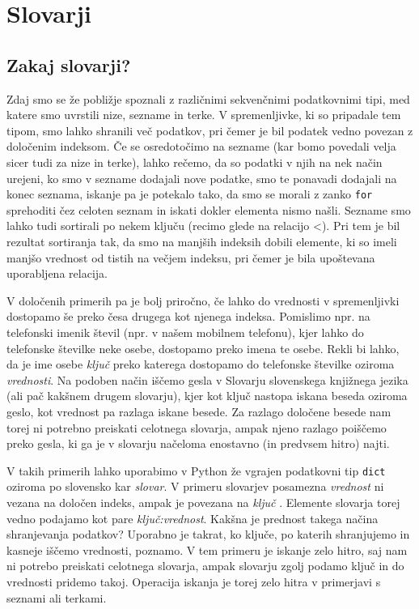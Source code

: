 \chapter{Slovarji}

\section{Zakaj slovarji?}

Zdaj smo se že pobližje spoznali z različnimi sekvenčnimi podatkovnimi tipi, med katere smo uvrstili nize, sezname in terke. V spremenljivke, ki so pripadale tem tipom, smo lahko shranili več podatkov, pri čemer je bil podatek vedno povezan z določenim indeksom. Če se osredotočimo na sezname (kar bomo povedali velja sicer tudi za nize in terke), lahko rečemo, da so podatki v njih na nek način urejeni, ko smo v sezname dodajali nove podatke, smo te ponavadi dodajali na konec seznama, iskanje pa je potekalo tako, da smo se morali z zanko \texttt{for} sprehoditi čez celoten seznam in iskati dokler elementa nismo našli. Sezname smo lahko tudi sortirali po nekem ključu (recimo glede na relacijo <). Pri tem je bil rezultat sortiranja tak, da smo na manjših indeksih dobili elemente, ki so imeli manjšo vrednost od tistih na večjem indeksu, pri čemer je bila upoštevana uporabljena relacija. 

V določenih primerih pa je bolj priročno, če lahko do vrednosti v spremenljivki dostopamo še preko česa drugega kot njenega indeksa. Pomislimo npr. na telefonski imenik števil (npr. v našem mobilnem telefonu), kjer lahko do telefonske številke neke osebe, dostopamo preko imena te osebe. Rekli bi lahko, da je ime osebe \emph{ključ} preko katerega dostopamo do telefonske številke oziroma \emph{vrednosti}. Na podoben način iščemo gesla v Slovarju slovenskega knjižnega jezika (ali pač kakšnem drugem slovarju), kjer kot ključ nastopa iskana beseda oziroma geslo, kot vrednost pa razlaga iskane besede. Za razlago določene besede nam torej ni potrebno preiskati celotnega slovarja, ampak njeno razlago poiščemo preko gesla, ki ga je v slovarju načeloma enostavno (in predvsem hitro) najti.

V takih primerih lahko uporabimo v Python že vgrajen podatkovni tip \texttt{dict}  oziroma po slovensko kar \emph{slovar}. V primeru slovarjev posamezna \emph{vrednost}  ni vezana na določen indeks, ampak je povezana na  \emph{ključ} . Elemente slovarja torej vedno podajamo kot pare \emph{ključ:vrednost}. Kakšna je prednost takega načina shranjevanja podatkov? Uporabno je takrat, ko ključe, po katerih shranjujemo in kasneje iščemo vrednosti, poznamo. V tem primeru je iskanje zelo hitro, saj nam ni potrebo preiskati celotnega slovarja, ampak slovarju zgolj podamo ključ in do vrednosti pridemo takoj. Operacija iskanja je torej zelo hitra v primerjavi s seznami ali terkami.

